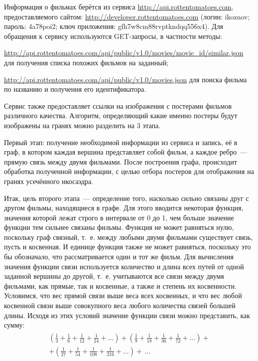 \documentclass[oneside,final,12pt]{extreport}
\begin{document}
	
Информация о фильмах берётся из сервиса \url{http://api.rottentomatoes.com}, предоставляемого сайтом: \url{http://developer.rottentomatoes.com} (логин: ikoznov; пароль: 4a78poi2; ключ приложения: gfh7w8cm88rvptkndqq556x4). Для обращения к сервису используются GET-запросы, в частности методы:
	
\url{http://api.rottentomatoes.com/api/public/v1.0/movies/movie_id/similar.json} для получения списка похожих фильмов на заданный;

\url{http://api.rottentomatoes.com/api/public/v1.0/movies.json} для поиска фильма по названию и получения его идентификатора.

Сервис также предоставляет ссылки на изображения с постерами фильмов различного качества. Алгоритм, определяющий какие именно постеры будут изображены на гранях можно разделить на 3 этапа.

Первый этап: получение необходимой информации из сервиса и запись, её в граф, в котором каждая вершина представляет собой фильм, а каждое ребро~--- прямую связь между двумя фильмами. После построения графа, происходит обработка полученной информации, с целью отбора постеров для отображения на гранях усечённого икосаэдра.

Итак, цель второго этапа~--- определение того, насколько сильно связаны друг с другом фильмы, находящиеся в графе. Для этого вводится некоторая функция, значения которой лежат строго в интервале от 0 до 1, чем больше значение функции тем сильнее связаны фильмы. Функция не может равняться нулю, поскольку граф связный, т.~е. между любыми двумя фильмами существует связь, пусть и косвенная. И единице функция также не может равняться, поскольку это бы обозначало, что рассматривается один и тот же фильм. Для вычисления значения функции связи используется количество и длина всех путей от одной заданной вершины до другой, т.~е. учитываются все связи между двумя фильмами, как прямые, так и косвенные, а также и степень их косвенности. Условимся, что вес прямой связи выше веса всех косвенных, и что вес любой косвенной связи выше совокупного веса любого количества связей большей длины. Исходя из этих условий значение функции связи можно представить, как сумму:
\begin{align*} \begin{split}
\left ( \frac{1}{3} + \frac{1}{6} + \frac{1}{12} + \frac{1}{24} + \ldots \right ) +
\left ( \frac{1}{9} + \frac{1}{18} + \frac{1}{36} + \frac{1}{72} + \ldots \right ) + \\ +
\left ( \frac{1}{27} + \frac{1}{54} + \frac{1}{108} + \frac{1}{216} + \ldots \right ) + \,\ldots
\end{split} \end{align*}
\end{document}
